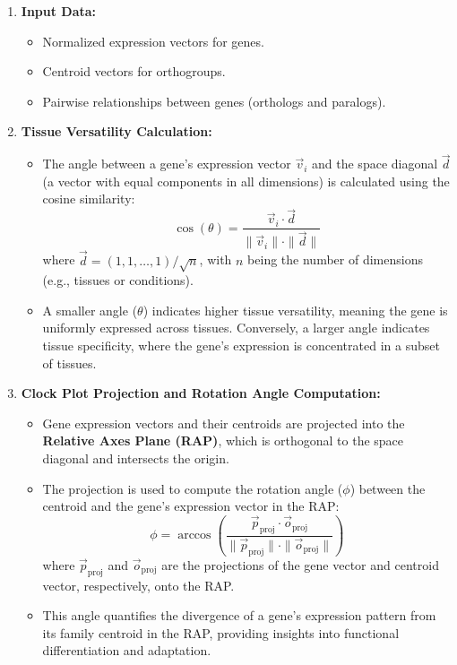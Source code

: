 \documentclass{article}
\begin{document}
\begin{enumerate}
    \item \textbf{Input Data:}
    \begin{itemize}
        \item Normalized expression vectors for genes.
        \item Centroid vectors for orthogroups.
        \item Pairwise relationships between genes (orthologs and paralogs).
    \end{itemize}

    \item \textbf{Tissue Versatility Calculation:}
    \begin{itemize}
        \item The angle between a gene's expression vector \( \vec{v}_i \) and the space diagonal \( \vec{d} \) (a vector with equal components in all dimensions) is calculated using the cosine similarity:
        \[
        \cos(\theta) = \frac{\vec{v}_i \cdot \vec{d}}{\|\vec{v}_i\| \cdot \|\vec{d}\|}
        \]
        where \( \vec{d} = (1, 1, \dots, 1) / \sqrt{n} \), with \( n \) being the number of dimensions (e.g., tissues or conditions).
        \item A smaller angle (\( \theta \)) indicates higher tissue versatility, meaning the gene is uniformly expressed across tissues. Conversely, a larger angle indicates tissue specificity, where the gene's expression is concentrated in a subset of tissues.
    \end{itemize}

    \item \textbf{Clock Plot Projection and Rotation Angle Computation:}
    \begin{itemize}
        \item Gene expression vectors and their centroids are projected into the \textbf{Relative Axes Plane (RAP)}, which is orthogonal to the space diagonal and intersects the origin.
        \item The projection is used to compute the rotation angle (\( \phi \)) between the centroid and the gene's expression vector in the RAP:
        \[
        \phi = \arccos\left(\frac{\vec{p}_{\text{proj}} \cdot \vec{o}_{\text{proj}}}{\|\vec{p}_{\text{proj}}\| \cdot \|\vec{o}_{\text{proj}}\|}\right)
        \]
        where \( \vec{p}_{\text{proj}} \) and \( \vec{o}_{\text{proj}} \) are the projections of the gene vector and centroid vector, respectively, onto the RAP.
        \item This angle quantifies the divergence of a gene's expression pattern from its family centroid in the RAP, providing insights into functional differentiation and adaptation.
    \end{itemize}


\end{enumerate}
\end{document}
